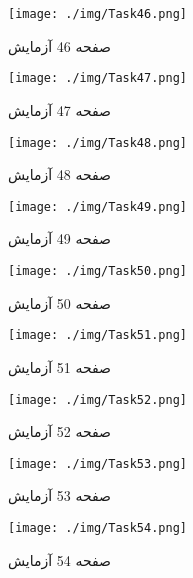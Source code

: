{ 
\begin{figure}[htpb]
\centering
\texttt{[image: ./img/Task46.png]}
\caption{ صفحه 46 آزمایش }
\label{fig:Task46}
\end{figure}
 
 
\begin{figure}[htpb]
\centering
\texttt{[image: ./img/Task47.png]}
\caption{ صفحه 47 آزمایش }
\label{fig:Task47}
\end{figure}
 
 
\begin{figure}[htpb]
\centering
\texttt{[image: ./img/Task48.png]}
\caption{ صفحه 48 آزمایش }
\label{fig:Task48}
\end{figure}
 
 
\begin{figure}[htpb]
\centering
\texttt{[image: ./img/Task49.png]}
\caption{ صفحه 49 آزمایش }
\label{fig:Task49}
\end{figure}
 
 
\begin{figure}[htpb]
\centering
\texttt{[image: ./img/Task50.png]}
\caption{ صفحه 50 آزمایش }
\label{fig:Task50}
\end{figure}
 
 
\begin{figure}[htpb]
\centering
\texttt{[image: ./img/Task51.png]}
\caption{ صفحه 51 آزمایش }
\label{fig:Task51}
\end{figure}
 
 
\begin{figure}[htpb]
\centering
\texttt{[image: ./img/Task52.png]}
\caption{ صفحه 52 آزمایش }
\label{fig:Task52}
\end{figure}
 
 
\begin{figure}[htpb]
\centering
\texttt{[image: ./img/Task53.png]}
\caption{ صفحه 53 آزمایش }
\label{fig:Task53}
\end{figure}
 
 
\begin{figure}[htpb]
\centering
\texttt{[image: ./img/Task54.png]}
\caption{ صفحه 54 آزمایش }
\label{fig:Task54}
\end{figure}
 
}
